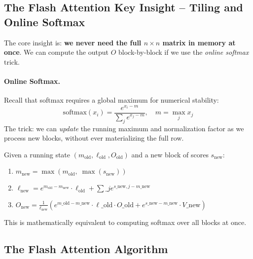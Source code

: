\subsection{The Flash Attention Key Insight -- Tiling and Online Softmax}
\label{the-flash-attention-key-insight-tiling-and-online-softmax}

The core insight is: \textbf{we never need the full $n \times n$ matrix in memory at once}. We can compute the output $O$ block-by-block if we use the \emph{online softmax} trick.

\paragraph{Online Softmax.}
\label{online-softmax.}

Recall that softmax requires a global maximum for numerical stability: 
\[
\text{softmax}(x_i) = \frac{e^{x_i - m}}{\sum_j e^{x_j - m}}, \quad m = \max_j x_j
\]
 The trick: we can \emph{update} the running maximum and normalization factor as we process new blocks, without ever materializing the full row.

\begin{keybox}
Given a running state $(m_{\text{old}}, \ell_{\text{old}}, O_{\text{old}})$ and a new block of scores $s_{\text{new}}$:

\begin{enumerate}
  \item $m_{\text{new}} = \max(m_{\text{old}},\; \max(s_{\text{new}}))$
  \item $\ell_{\text{new}} = e^{m_{\text{old}} - m_{\text{new}}} \cdot \ell_{\text{old}}
        + \sum\_j e^{s\_{\text{new},j} - m\_{\text{new}}}$
  \item $O_{\text{new}} = \frac{1}{\ell_{\text{new}}} \left(
        e^{m\_{\text{old}} - m\_{\text{new}}} \cdot \ell\_{\text{old}} \cdot O\_{\text{old}}
        + e^{s\_{\text{new}} - m\_{\text{new}}} \cdot V\_{\text{new}} \right)$
\end{enumerate}

This is mathematically equivalent to computing softmax over all blocks at once.
\end{keybox}

\subsection{The Flash Attention Algorithm}
\label{the-flash-attention-algorithm}

